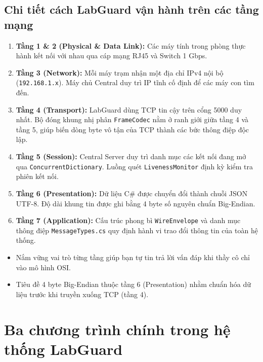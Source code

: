 \documentclass[12pt,a4paper]{article}
\begin{document}
\subsection{Chi tiết cách LabGuard vận hành trên các tầng mạng}
\begin{enumerate}
  \item \textbf{Tầng 1 \& 2 (Physical \& Data Link):} Các máy tính trong phòng thực hành kết nối với nhau qua cáp mạng RJ45 và Switch 1 Gbps.
  \item \textbf{Tầng 3 (Network):} Mỗi máy trạm nhận một địa chỉ IPv4 nội bộ (\texttt{192.168.1.x}). Máy chủ Central duy trì IP tĩnh cố định để các máy con tìm đến.
  \item \textbf{Tầng 4 (Transport):} LabGuard dùng TCP tin cậy trên cổng 5000 duy nhất. Bộ đóng khung nhị phân \texttt{FrameCodec} nằm ở ranh giới giữa tầng 4 và tầng 5, giúp biến dòng byte vô tận của TCP thành các bức thông điệp độc lập.
  \item \textbf{Tầng 5 (Session):} Central Server duy trì danh mục các kết nối đang mở qua \texttt{Concurrent\allowbreak{}Dictionary}. Luồng quét \texttt{LivenessMonitor} định kỳ kiểm tra phiên kết nối.
  \item \textbf{Tầng 6 (Presentation):} Dữ liệu C\# được chuyển đổi thành chuỗi JSON UTF-8. Độ dài khung tin được ghi bằng 4 byte số nguyên chuẩn Big-Endian.
  \item \textbf{Tầng 7 (Application):} Cấu trúc phong bì \texttt{WireEnvelope} và danh mục thông điệp \texttt{MessageTypes.cs} quy định hành vi trao đổi thông tin của toàn hệ thống.
\end{enumerate}

\begin{takeawaybox}
\begin{itemize}[leftmargin=1.5em, itemsep=1pt]
  \item Nắm vững vai trò từng tầng giúp bạn tự tin trả lời vấn đáp khi thầy cô chỉ vào mô hình OSI.
  \item Tiêu đề 4 byte Big-Endian thuộc tầng 6 (Presentation) nhằm chuẩn hóa dữ liệu trước khi truyền xuống TCP (tầng 4).
\end{itemize}
\end{takeawaybox}

\section{Ba chương trình chính trong hệ thống LabGuard}
\end{document}
